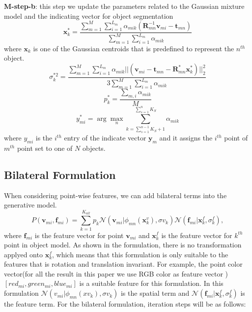 \textbf{M-step-b}: this step we update the parameters related to the Gaussian mixture model and the indicating vector for object segmentation 
\begin{equation}
\label{equ:updatexk}
\mathbf x_k^*=\frac{\sum_{m=1}^M\sum_{i=1}^{L_m}\alpha_{mik}(\mathbf{R}_{mn}^{-1}\mathbf{v}_{mi}-\mathbf t_{mn})}{\sum_{m=1}^M\sum_{i=1}^{L_m}\alpha_{mik}}
\end{equation}
where $\mathbf{x}_k$ is one of the Gaussian centroids that is predefined to represent the $n^{th}$ object. 
\begin{equation}
\label{equ:updatesigma}
\sigma_k^{*2}=\frac{\sum_{m=1}^M\sum_{i=1}^{L_m}\alpha_{mik}||(\mathbf{v}_{mi}-\mathbf t_{mn}-\mathbf{R}_{mn}^*\mathbf x_k^*)||_2^2}{3\sum_{m=1}^M\sum_{i=1}^{L_m}\alpha_{mik}}
\end{equation}
\begin{equation}
\label{equ:updatepk}
p_k^*=\frac{\sum_{m,i}\alpha_{mik}}{M}
\end{equation}
\begin{equation}
\label{equ:updatey}
y_{mi}^*=\arg \max_n \sum_{k=\sum_{s=1}^{n-1}K_S+1}^{\sum_{s=1}^{n}K_S} \alpha_{mik} 
\end{equation}
where $y_{mi}$ is the $i^{th}$ entry of the indicate vector $\mathbf{y}_{m}$ and it assigns the $i^{th}$ point of $m^{th}$ point set to one of $N$ objects.  
\subsection{Bilateral Formulation}
When considering point-wise features, we can add bilateral terms into the generative model.
\begin{equation}
P(\mathbf{v}_{mi},\mathbf{f}_{mi})=\sum^{K_{all}}_{k=1}p_k\mathcal{N}(\mathbf{v}_{mi}|\phi_{mn}(\mathbf{x}^v_k),\sigma v_k)\mathcal{N}(\mathbf{f}_{mi}|\mathbf{x}^f_k,\sigma^f_k),
\end{equation}
where $\mathbf{f}_{mi}$ is the feature vector for point $\mathbf{v}_{mi}$ and $\mathbf{x}_k^f$ is the feature vector for $k^{th}$ point in object model. As shown in the formulation, there is no transformation applyed onto $\mathbf{x}_k^f$, which means that this formulation is only suitable to the features that is rotation and translation invariant. For example, the point color vector(for all the result in this paper we use RGB color as feature vector ) $[red_{mi},green_{mi},blue_{mi}]$ is a suitable feature for this formulation. In this formulation $\mathcal{N}(v_{mi}|\phi_{mn}(xv_k),\sigma v_k)$ is the spatial term and $\mathcal{N}(\mathbf{f}_{mi}|\mathbf{x}^f_k,\sigma^f_k)$ is the feature term.
For the bilateral formulation, iteration steps will be as follows:

